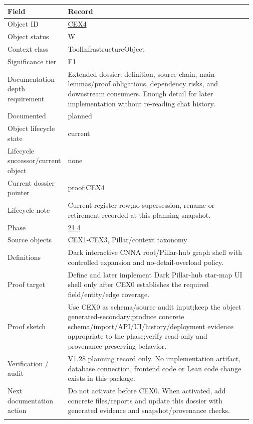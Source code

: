 \begin{longtable}{L{0.16\linewidth} L{0.81\linewidth}}
\hline
\textbf{Field} & \textbf{Record}\\
\hline
Object ID & \hyperlink{object-row-CEX4}{CEX4}\\
\hline\addlinespace[0.20em]
Object status & W\\
\hline\addlinespace[0.20em]
Context class & ToolInfrastructureObject\\
\hline\addlinespace[0.20em]
Significance tier & F1\\
\hline\addlinespace[0.20em]
Documentation depth requirement & Extended dossier: definition, source chain, main lemmas/\allowbreak{}proof obligations, dependency risks, and downstream consumers. Enough detail for later implementation without re-reading chat history.\\
\hline\addlinespace[0.20em]
Documented & planned\\
\hline\addlinespace[0.20em]
Object lifecycle state & current\\
\hline\addlinespace[0.20em]
Lifecycle successor/\allowbreak{}current object & none\\
\hline\addlinespace[0.20em]
Current dossier pointer & proof:CEX4\\
\hline\addlinespace[0.20em]
Lifecycle note & Current register row;\newline no supersession, rename or retirement recorded at this planning snapshot.\\
\hline\addlinespace[0.20em]
Phase & \hyperlink{phase-row-21-4}{21.4}\\
\hline\addlinespace[0.20em]
Source objects & CEX1-CEX3, Pillar/\allowbreak{}context taxonomy\\
\hline\addlinespace[0.20em]
Definitions & Dark interactive CNNA root/\allowbreak{}Pillar-hub graph shell with controlled expansion and no-detail-overload policy.\\
\hline\addlinespace[0.20em]
Proof target & Define and later implement Dark Pillar-hub star-map UI shell only after CEX0 establishes the required field/\allowbreak{}entity/\allowbreak{}edge coverage.\\
\hline\addlinespace[0.20em]
Proof sketch & Use CEX0 as schema/\allowbreak{}source audit input;\newline keep the object generated-secondary;\newline produce concrete schema/\allowbreak{}import/\allowbreak{}API/\allowbreak{}UI/\allowbreak{}history/\allowbreak{}deployment evidence appropriate to the phase;\newline verify read-only and provenance-preserving behavior.\\
\hline\addlinespace[0.20em]
Verification /\allowbreak{} audit & V1.28 planning record only. No implementation artifact, database connection, frontend code or Lean code change exists in this package.\\
\hline\addlinespace[0.20em]
Next documentation action & Do not activate before CEX0. When activated, add concrete files/\allowbreak{}reports and update this dossier with generated evidence and snapshot/\allowbreak{}provenance checks.\\
\hline\addlinespace[0.20em]
\end{longtable}

